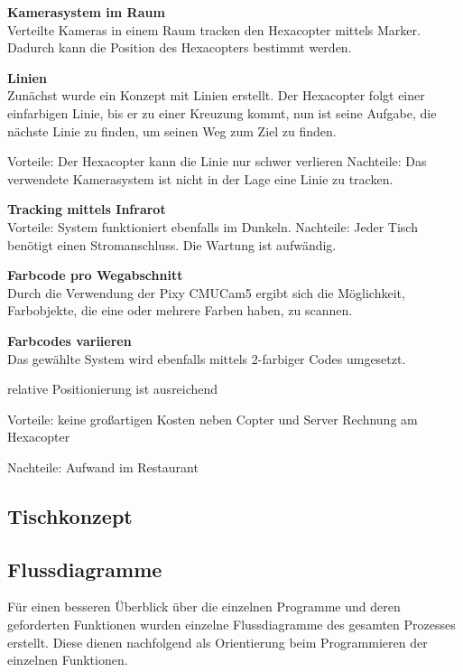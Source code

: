       \textbf{Kamerasystem im Raum}\\
      Verteilte Kameras in einem Raum tracken den Hexacopter mittels Marker. Dadurch kann die Position des Hexacopters bestimmt werden.


      \textbf{Linien}\\
      Zunächst wurde ein Konzept mit Linien erstellt. Der Hexacopter folgt einer einfarbigen Linie, bis er zu einer Kreuzung kommt, nun ist seine Aufgabe, die nächste Linie zu finden, um seinen Weg zum Ziel zu finden.  

      Vorteile: Der Hexacopter kann die Linie nur schwer verlieren
      Nachteile: Das verwendete Kamerasystem ist nicht in der Lage eine Linie zu tracken.

      \textbf{Tracking mittels Infrarot}\\


      Vorteile:
      System funktioniert ebenfalls im Dunkeln.
      Nachteile: 
      Jeder Tisch benötigt einen Stromanschluss.
      Die Wartung ist aufwändig.

      \textbf{Farbcode pro Wegabschnitt}\\
      Durch die Verwendung der Pixy CMUCam5 ergibt sich die Möglichkeit, Farbobjekte, die eine oder mehrere Farben haben, zu scannen.



      \textbf{Farbcodes variieren}\\
      Das gewählte System wird ebenfalls mittels 2-farbiger Codes umgesetzt.


      relative Positionierung ist ausreichend

      Vorteile:
      keine großartigen Kosten neben Copter und Server
      Rechnung am Hexacopter

      Nachteile:
      Aufwand im Restaurant
      
   

  \subsection{Tischkonzept}



  \subsection{Flussdiagramme}
  Für einen besseren Überblick über die einzelnen Programme und deren geforderten Funktionen wurden einzelne Flussdiagramme des gesamten Prozesses erstellt.
  Diese dienen nachfolgend als Orientierung beim Programmieren der einzelnen Funktionen.

